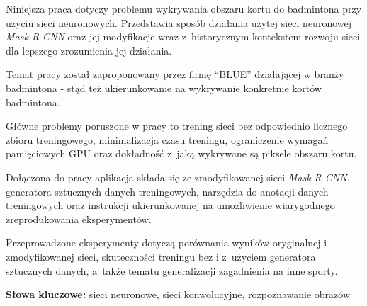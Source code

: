 Niniejsza praca dotyczy problemu wykrywania obszaru kortu do badmintona przy użyciu sieci neuronowych.
Przedstawia sposób działania użytej sieci neuronowej \textit{Mask R-CNN} \cite{general-mask-rcnn} oraz jej modyfikacje wraz z~historycznym kontekstem rozwoju sieci dla lepszego zrozumienia jej działania.

Temat pracy został zaproponowany przez firmę ``BLUE'' działającej w branży badmintona - stąd też ukierunkowanie na wykrywanie konkretnie kortów badmintona.

Główne problemy poruszone w pracy to trening sieci bez odpowiednio licznego zbioru treningowego, minimalizacja czasu treningu, ograniczenie wymagań pamięciowych GPU oraz dokładność z~jaką wykrywane są piksele obszaru kortu.

Dołączona do pracy aplikacja składa się ze zmodyfikowanej sieci \textit{Mask R-CNN}, generatora sztucznych danych treningowych, narzędzia do anotacji danych treningowych oraz instrukcji ukierunkowanej na umożliwienie wiarygodnego zreprodukowania eksperymentów.

Przeprowadzone eksperymenty dotyczą porównania wyników oryginalnej i zmodyfikowanej sieci, skuteczności treningu bez i z~użyciem generatora sztucznych danych, a~także tematu generalizacji zagadnienia na inne sporty.
\\


\noindent \textbf{Słowa kluczowe:} sieci neuronowe, sieci konwolucyjne, rozpoznawanie obrazów
